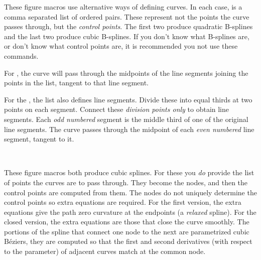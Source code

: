 \documentclass[letterpaper]{article}
\begin{document}
These figure macros use alternative ways of defining curves. In each case,
 is a comma separated list of ordered pairs. These represent
not the points the curve passes through, but the \emph{control points}.
The first two produce quadratic B-splines and the last two produce cubic
B-splines. If you don't know what B-splines are, or don't know what
control points are, it is recommended you not use these commands.

For , the curve will pass through the midpoints of the line
segments joining the points in the list, tangent to that line segment.

For the , the list also defines line segments. Divide these
into equal thirds at two points on each segment. Connect these
\emph{division points only} to obtain line segments. Each \emph{odd
numbered} segment is the middle third of one of the original line
segments. The  curve passes through the midpoint of each
\emph{even numbered} line segment, tangent to it.

\begin{cd}
\\
%
%
%
\end{cd}

These figure macros both produce cubic splines. For these you \emph{do}
provide the list of points the curves are to pass through. They become
the nodes, and then the control points are computed from them. The nodes
do not uniquely determine the control points so extra equations are
required. For the first version, the extra equations give the path zero
curvature at the endpoints (a \emph{relaxed} spline). For the closed
version, the extra equations are those that close the curve smoothly.
The portions of the spline that connect one node to the next are
parametrized cubic B\'eziers, they are computed so that the first and
second derivatives (with respect to the parameter) of adjacent curves
match at the common node.

\begin{cd}
\\
%
%
%
\end{cd}
\end{document}
